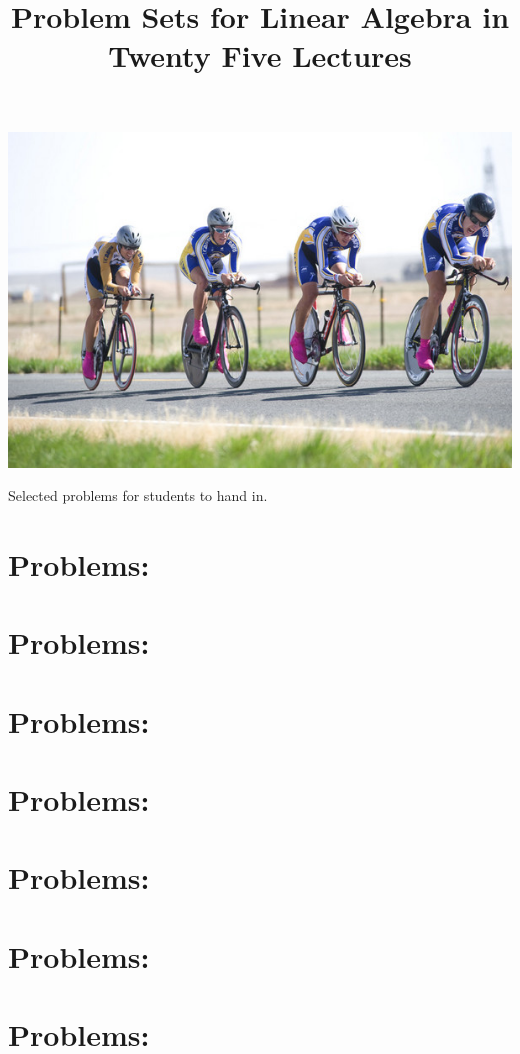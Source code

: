 \documentclass[10pt]{article}
\newcommand{\1}{{\mathrm 1\hspace*{-0.4ex}%
\rule{0.1ex}{1.52ex}\hspace*{0.2ex}}}
\newcommand{\problemtitle}[1]{\section{Problems: #1}}
\newcommand{\probleminput}[1]{}
\begin{document}
\pagestyle{plain}

\title{Problem Sets for Linear Algebra in Twenty Five Lectures}




\maketitle

\begin{center}
\includegraphics[scale=.6]{bikes.jpg}\\[8mm]
\end{center}

\begin{center}
Selected  problems for students to hand in.
\end{center}

\newpage

\tableofcontents

\newpage

\problemtitle{\whatIsTitle}
\probleminput{\whatIsPath/problems}

\problemtitle{\gaussElimTitle}
\probleminput{\gaussElimPath/problems}

\problemtitle{\elemRowOpsTitle}
\probleminput{\elemRowOpsPath/problems}

\problemtitle{\solutionSetsTitle}
\probleminput{\solutionSetsPath/problems}

\problemtitle{\vectorsInSpaceTitle}
\probleminput{\vectorsInSpacePath/problems}

\problemtitle{\vectorSpacesTitle}
\probleminput{\vectorSpacesPath/problems}

\problemtitle{\linTransTitle}
\probleminput{\linTransPath/problems}
\end{document}

